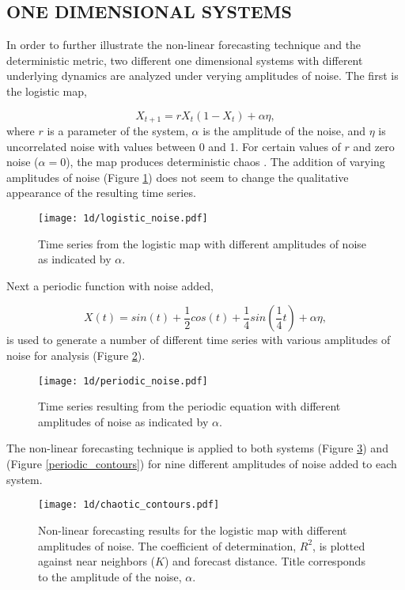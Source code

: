 
\newpage

\subsection{ONE DIMENSIONAL SYSTEMS} 

In order to further illustrate the non-linear forecasting technique and the deterministic metric, two different one dimensional systems with different underlying dynamics are analyzed under verying amplitudes of noise. The first is the logistic map,

$$X_{t+1} = r X_t (1-X_t) + \alpha\eta,$$
where $r$ is a parameter of the system, $\alpha$ is the amplitude of the noise, and $\eta$ is uncorrelated noise with values between 0 and 1. For certain values of $r$ and zero noise ($\alpha=0$), the map produces deterministic chaos \cite{logistic_equation}. The addition of varying amplitudes of noise (Figure \ref{logistic_noise}) does not seem to change the qualitative appearance of the resulting time series. 

\begin{figure}[htbp]  %
   \centering
   \texttt{[image: 1d/logistic\_noise.pdf]} 
   \caption{Time series from the logistic map with different amplitudes of noise as indicated by $\alpha$. }
   \label{logistic_noise}
\end{figure}


Next a periodic function with noise added,

$$X(t) = sin(t) +\frac{1}{2}cos(t) + \frac{1}{4}sin(\frac{1}{4}t) + \alpha\eta,$$
is used to generate a number of different time series with various amplitudes of noise for analysis (Figure \ref{periodic_noise}).

\begin{figure}[htbp]  %
   \centering
   \texttt{[image: 1d/periodic\_noise.pdf]} 
   \caption{Time series resulting from the periodic equation with different amplitudes of noise as indicated by $\alpha$.}
   \label{periodic_noise}
\end{figure}


The non-linear forecasting technique is applied to both systems (Figure \ref{logistic_contours}) and (Figure \ref{periodic_contours}) for nine different amplitudes of noise added to each system.


\begin{figure}[htbp]  %
   \centering
   \texttt{[image: 1d/chaotic\_contours.pdf]} 
   \caption{Non-linear forecasting results for the logistic map with different amplitudes of noise. The coefficient of determination, $R^2$, is plotted against near neighbors ($K$) and forecast distance. Title corresponds to the amplitude of the noise, $\alpha$.}
   \label{logistic_contours}
\end{figure}



